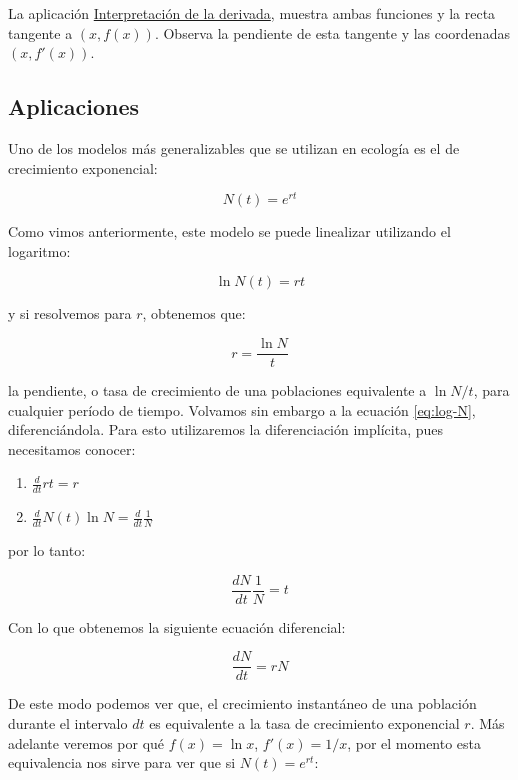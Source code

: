 \documentclass[
]{book}
\providecommand{\tightlist}{%
  \setlength{\itemsep}{0pt}\setlength{\parskip}{0pt}}
\begin{document}
La aplicación \href{https://www.geogebra.org/classic/w3spjhc7}{Interpretación de la derivada}, muestra ambas funciones y la recta tangente a \((x,f(x))\). Observa la pendiente de esta tangente y las coordenadas \((x, f'(x))\).

\hypertarget{aplicaciones}{%
\subsection{Aplicaciones}\label{aplicaciones}}

Uno de los modelos más generalizables que se utilizan en ecología es el de crecimiento exponencial:

\[N(t) = e^{rt}\]

Como vimos anteriormente, este modelo se puede linealizar utilizando el logaritmo:

\begin{equation}
\ln N(t) = rt \label{eq:log-N}
\end{equation}

y si resolvemos para \(r\), obtenemos que:

\[r = \frac{\ln N}{t}\]

la pendiente, o tasa de crecimiento de una poblaciones equivalente a \(\ln N/t\), para cualquier período de tiempo. Volvamos sin embargo a la ecuación \eqref{eq:log-N}, diferenciándola. Para esto utilizaremos la diferenciación implícita, pues necesitamos conocer:

\begin{enumerate}
\def\labelenumi{\arabic{enumi}.}
\tightlist
\item
  \(\frac{d}{dt}rt = r\)
\item
  \(\frac{d}{dt}N(t) \ln N = \frac{d}{dt} \frac{1}{N}\)
\end{enumerate}

por lo tanto:

\[\frac{dN}{dt} \frac{1}{N} = t\]

Con lo que obtenemos la siguiente ecuación diferencial:

\begin{equation}
\frac{dN}{dt} = rN
\end{equation}

De este modo podemos ver que, el crecimiento instantáneo de una población durante el intervalo \(dt\) es equivalente a la tasa de crecimiento exponencial \(r\). Más adelante veremos por qué \(f(x) = \ln x\), \(f'(x) = 1/x\), por el momento esta equivalencia nos sirve para ver que si \(N(t) = e^{rt}\):
\end{document}
